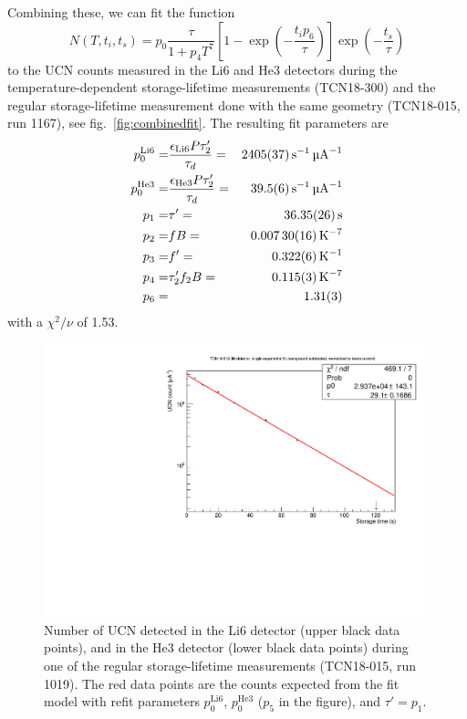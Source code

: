 \documentclass[10pt,letterpaper]{article}
\begin{document}
Combining these, we can fit the function
\begin{equation}
N(T,t_i,t_s) = p_0 \frac{\tau}{1 + p_4 T^7}
    \left[ 1 - \exp \left( -\frac{t_i p_6}{\tau} \right) \right]
    \exp \left( -\frac{t_s}{\tau} \right)
\end{equation}
to the UCN counts measured in the Li6 and He3 detectors during the temperature-dependent storage-lifetime measurements (TCN18-300) and the regular storage-lifetime measurement done with the same geometry (TCN18-015, run 1167), see fig.~\ref{fig:combinedfit}.
The resulting fit parameters are
\begin{eqnarray}
p_0^\mathrm{Li6} =& \frac{\epsilon_\mathrm{Li6} P \tau_2'}{\tau_d} =& \SI{2405+-37}{\per\second\per\micro\ampere} \\
p_0^\mathrm{He3} =& \frac{\epsilon_\mathrm{He3} P \tau_2'}{\tau_d} =& \SI{39.5+-0.6}{\per\second\per\micro\ampere} \\
p_1 =& \tau' =& \SI{36.35+-0.26}{\second} \\
p_2 =& f B =& \SI{0.00730+-0.00016}{\per\kelvin\tothe{7}} \\
p_3 =& f' =& \SI{0.322+-0.006}{\per\kelvin} \\
p_4 =& \tau_2' f_2 B =& \SI{0.115+-0.003}{\per\kelvin\tothe{7}} \\
p_6 =& & \num{1.31+-0.03}
\end{eqnarray}
with a $\chi^2/\nu$ of \num{1.53}.

\begin{figure}
\centering
\includegraphics[width=\textwidth,page=3]{../storagelifetime/TCN18-015_1019.pdf}
\caption{Number of UCN detected in the Li6 detector (upper black data points), and in the He3 detector (lower black data points) during one of the regular storage-lifetime measurements (TCN18-015, run 1019). The red data points are the counts expected from the fit model with refit parameters $p_0^\mathrm{Li6}$, $p_0^\mathrm{He3}$ ($p_5$ in the figure), and $\tau' = p_1$.}
\label{fig:storagelifetime_corrected}
\end{figure}
\end{document}
